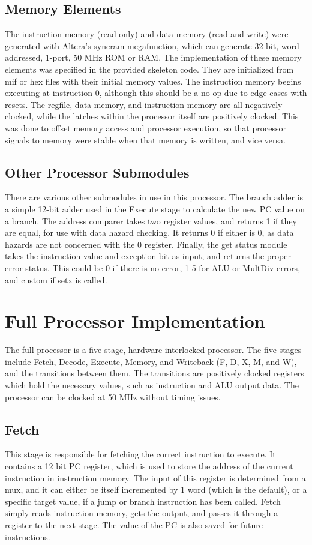 \documentclass[letterpaper]{article} %
\begin{document}
\subsection*{Memory Elements}
The instruction memory (read-only) and data memory (read and write) were generated with Altera's syncram megafunction, which can generate 32-bit, word addressed, 1-port, 50 MHz ROM or RAM. The implementation of these memory elements was specified in the provided skeleton code. They are initialized from mif or hex files with their initial memory values. The instruction memory begins executing at instruction 0, although this should be a no op due to edge cases with resets. The regfile, data memory, and instruction memory are all negatively clocked, while the latches within the processor itself are positively clocked. This was done to offset memory access and processor execution, so that processor signals to memory were stable when that memory is written, and vice versa.

\subsection*{Other Processor Submodules}
There are various other submodules in use in this processor. The branch adder is a simple 12-bit adder used in the Execute stage to calculate the new PC value on a branch. The address comparer takes two register values, and returns 1 if they are equal, for use with data hazard checking. It returns 0 if either is 0, as data hazards are not concerned with the 0 register. Finally, the get status module takes the instruction value and exception bit as input, and returns the proper error status. This could be 0 if there is no error, 1-5 for ALU or MultDiv errors, and custom if setx is called. \\

\section*{Full Processor Implementation}
The full processor is a five stage, hardware interlocked processor. The five stages include Fetch, Decode, Execute, Memory, and Writeback (F, D, X, M, and W), and the transitions between them. The transitions are positively clocked registers which hold the necessary values, such as instruction and ALU output data. The processor can be clocked at 50 MHz without timing issues.\\

\subsection*{Fetch}
This stage is responsible for fetching the correct instruction to execute. It contains a 12 bit PC register, which is used to store the address of the current instruction in instruction memory. The input of this register is determined from a mux, and it can either be itself incremented by 1 word (which is the default), or a specific target value, if a jump or branch instruction has been called. Fetch simply reads instruction memory, gets the output, and passes it through a register to the next stage. The value of the PC is also saved for future instructions. \\
\end{document}
